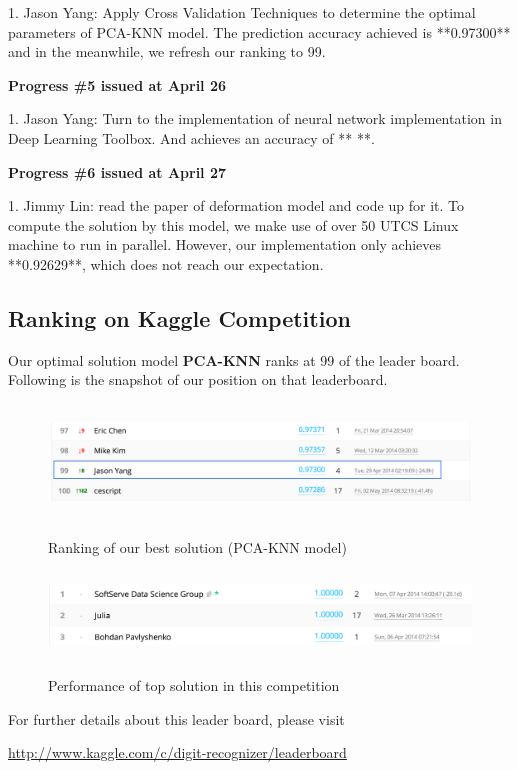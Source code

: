 \documentclass{article} %
\begin{document}
1. Jason Yang: Apply Cross Validation Techniques to determine the optimal parameters of
PCA-KNN model. The prediction accuracy achieved is **0.97300** and in the
meanwhile, we refresh our ranking to 99.


{\bf Progress \#5 issued at April 26 }

1. Jason Yang: Turn to the implementation of neural network implementation in
Deep Learning Toolbox. And achieves an accuracy of ** **.

{\bf Progress \#6 issued at April 27 }

1. Jimmy Lin: read the paper of deformation model and code up for it. To
compute the solution by this model, we make use of over 50 UTCS Linux machine
to run in parallel. However, our implementation only achieves **0.92629**,
which does not reach our expectation.

\subsection{Ranking on Kaggle Competition}

Our optimal solution model {\bf PCA-KNN} ranks at 99 of the leader board.
Following is the snapshot of our position on that leaderboard.

\begin{figure}[h]
    \centering
    \includegraphics[width=5.5in,height=1.2in]{./images/Rank.png} \\
    \caption{Ranking of our best solution (PCA-KNN model)}
\end{figure}

\begin{figure}[h]
    \centering
    \includegraphics[width=5.5in,height=0.9in]{./images/topRank.png} \\
    \caption{Performance of top solution in this competition}
\end{figure}
For further details about this leader board, please visit
\begin{center}
\url{http://www.kaggle.com/c/digit-recognizer/leaderboard} 
\end{center}
\end{document}
